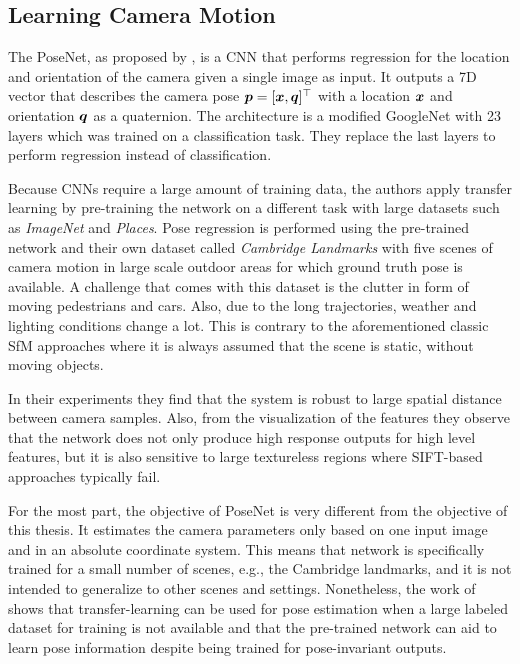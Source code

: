 		\subsection{Learning Camera Motion}
	
			The PoseNet, as proposed by \cite{kendall2015posenet}, is a CNN that performs regression for the location and orientation of the camera given a single image as input.
			It outputs a 7D vector that describes the camera pose $\bm{p} = [\bm{x}, \bm{q}]^\top$ with a location $\bm{x}$ and orientation $\bm{q}$ as a quaternion.
			The architecture is a modified GoogleNet with 23 layers which was trained on a classification task.
			They replace the last layers to perform regression instead of classification.
			
			Because CNNs require a large amount of training data, the authors apply transfer learning by pre-training the network on a different task with large datasets such as \emph{ImageNet} and \emph{Places}.
			Pose regression is performed using the pre-trained network and their own dataset called \emph{Cambridge Landmarks} with five scenes of camera motion in large scale outdoor areas for which ground truth pose is available.
			A challenge that comes with this dataset is the clutter in form of moving pedestrians and cars.
			Also, due to the long trajectories, weather and lighting conditions change a lot.
			This is contrary to the aforementioned classic SfM approaches where it is always assumed that the scene is static, without moving objects.
			
			In their experiments they find that the system is robust to large spatial distance between camera samples.
			Also, from the visualization of the features they observe that the network does not only produce high response outputs for high level features, but it is also sensitive to large textureless regions where {SIFT}-based approaches typically fail.
			
			For the most part, the objective of PoseNet is very different from the objective of this thesis.
			It estimates the camera parameters only based on one input image and in an absolute coordinate system.
			This means that network is specifically trained for a small number of scenes, e.g., the Cambridge landmarks, and it is not intended to generalize to other scenes and settings. 
			Nonetheless, the work of \citeauthor{kendall2015posenet} shows that transfer-learning can be used for pose estimation when a large labeled dataset for training is not available and that the pre-trained network can aid to learn pose information despite being trained for pose-invariant outputs.
			
